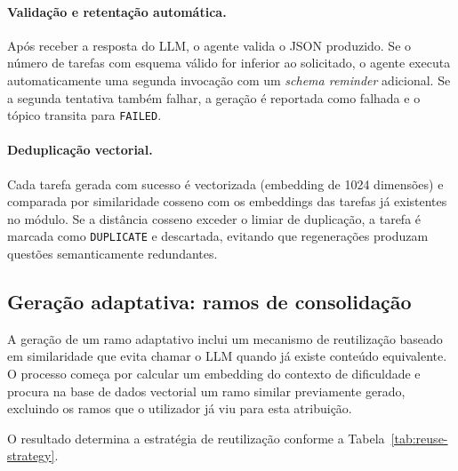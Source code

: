 \paragraph{Valida\c{c}\~ao e retenta\c{c}\~ao autom\'atica.}
Ap\'os receber a resposta do LLM, o agente valida o JSON produzido. Se o
n\'umero de tarefas com esquema v\'alido for inferior ao solicitado, o agente
executa automaticamente uma segunda invoca\c{c}\~ao com um \emph{schema reminder}
adicional. Se a segunda tentativa tamb\'em falhar, a gera\c{c}\~ao \'e reportada
como falhada e o t\'opico transita para \texttt{FAILED}.

\paragraph{Deduplica\c{c}\~ao vectorial.}
Cada tarefa gerada com sucesso \'e vectorizada (embedding de 1024 dimens\~oes)
e comparada por similaridade cosseno com os embeddings das tarefas j\'a
existentes no m\'odulo. Se a dist\^ancia cosseno exceder o limiar de
duplica\c{c}\~ao, a tarefa \'e marcada como \texttt{DUPLICATE} e descartada,
evitando que regenera\c{c}\~oes produzam quest\~oes semanticamente redundantes.

\subsection{Gera\c{c}\~ao adaptativa: ramos de consolida\c{c}\~ao}
\label{ssec:ia-geracao-adaptativa}

A gera\c{c}\~ao de um ramo adaptativo inclui um mecanismo de reutiliza\c{c}\~ao
baseado em similaridade que evita chamar o LLM quando j\'a existe conte\'udo
equivalente. O processo come\c{c}a por calcular um embedding do contexto de
dificuldade e procura na base de dados vectorial um ramo similar previamente
gerado, excluindo os ramos que o utilizador j\'a viu para esta atribui\c{c}\~ao.

O resultado determina a estrat\'egia de reutiliza\c{c}\~ao conforme a
Tabela~\ref{tab:reuse-strategy}.

